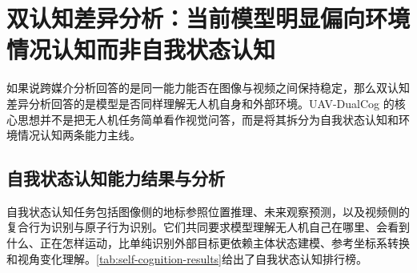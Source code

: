 \FloatBarrier
\section{双认知差异分析：当前模型明显偏向环境情况认知而非自我状态认知}

如果说跨媒介分析回答的是同一能力能否在图像与视频之间保持稳定，那么双认知差异分析回答的是模型是否同样理解无人机自身和外部环境。UAV-DualCog 的核心思想并不是把无人机任务简单看作视觉问答，而是将其拆分为自我状态认知和环境情况认知两条能力主线。

\subsection{自我状态认知能力结果与分析}

自我状态认知任务包括图像侧的地标参照位置推理、未来观察预测，以及视频侧的复合行为识别与原子行为识别。它们共同要求模型理解无人机自己在哪里、会看到什么、正在怎样运动，比单纯识别外部目标更依赖主体状态建模、参考坐标系转换和视角变化理解。\autoref{tab:self-cognition-results}给出了自我状态认知排行榜。

